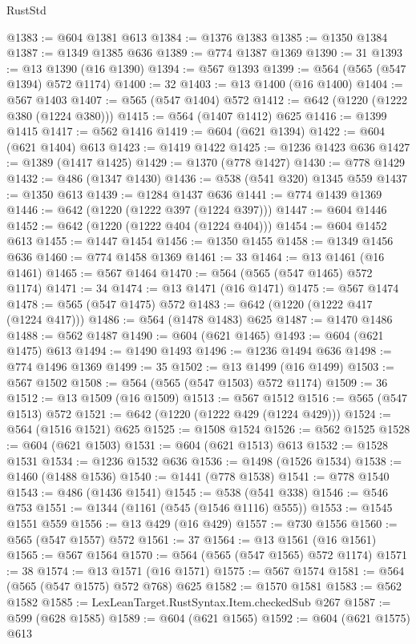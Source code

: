 \begin{lexlean}{RustStd}
\begin{coremodule}
@1383 := @604 @1381 @613
@1384 := @1376 @1383
@1385 := @1350 @1384
@1387 := @1349 @1385 @636
@1389 := @774 @1387 @1369
@1390 := 31
@1393 := @13 @1390 (@16 @1390)
@1394 := @567 @1393
@1399 := @564 (@565 (@547 @1394) @572 @1174)
@1400 := 32
@1403 := @13 @1400 (@16 @1400)
@1404 := @567 @1403
@1407 := @565 (@547 @1404) @572
@1412 := @642 (@1220 (@1222 @380 (@1224 @380)))
@1415 := @564 (@1407 @1412) @625
@1416 := @1399 @1415
@1417 := @562 @1416
@1419 := @604 (@621 @1394)
@1422 := @604 (@621 @1404) @613
@1423 := @1419 @1422
@1425 := @1236 @1423 @636
@1427 := @1389 (@1417 @1425)
@1429 := @1370 (@778 @1427)
@1430 := @778 @1429
@1432 := @486 (@1347 @1430)
@1436 := @538 (@541 @320) @1345 @559
@1437 := @1350 @613
@1439 := @1284 @1437 @636
@1441 := @774 @1439 @1369
@1446 := @642 (@1220 (@1222 @397 (@1224 @397)))
@1447 := @604 @1446
@1452 := @642 (@1220 (@1222 @404 (@1224 @404)))
@1454 := @604 @1452 @613
@1455 := @1447 @1454
@1456 := @1350 @1455
@1458 := @1349 @1456 @636
@1460 := @774 @1458 @1369
@1461 := 33
@1464 := @13 @1461 (@16 @1461)
@1465 := @567 @1464
@1470 := @564 (@565 (@547 @1465) @572 @1174)
@1471 := 34
@1474 := @13 @1471 (@16 @1471)
@1475 := @567 @1474
@1478 := @565 (@547 @1475) @572
@1483 := @642 (@1220 (@1222 @417 (@1224 @417)))
@1486 := @564 (@1478 @1483) @625
@1487 := @1470 @1486
@1488 := @562 @1487
@1490 := @604 (@621 @1465)
@1493 := @604 (@621 @1475) @613
@1494 := @1490 @1493
@1496 := @1236 @1494 @636
@1498 := @774 @1496 @1369
@1499 := 35
@1502 := @13 @1499 (@16 @1499)
@1503 := @567 @1502
@1508 := @564 (@565 (@547 @1503) @572 @1174)
@1509 := 36
@1512 := @13 @1509 (@16 @1509)
@1513 := @567 @1512
@1516 := @565 (@547 @1513) @572
@1521 := @642 (@1220 (@1222 @429 (@1224 @429)))
@1524 := @564 (@1516 @1521) @625
@1525 := @1508 @1524
@1526 := @562 @1525
@1528 := @604 (@621 @1503)
@1531 := @604 (@621 @1513) @613
@1532 := @1528 @1531
@1534 := @1236 @1532 @636
@1536 := @1498 (@1526 @1534)
@1538 := @1460 (@1488 @1536)
@1540 := @1441 (@778 @1538)
@1541 := @778 @1540
@1543 := @486 (@1436 @1541)
@1545 := @538 (@541 @338)
@1546 := @546 @753
@1551 := @1344 (@1161 (@545 (@1546 @1116) @555))
@1553 := @1545 @1551 @559
@1556 := @13 @429 (@16 @429)
@1557 := @730 @1556
@1560 := @565 (@547 @1557) @572
@1561 := 37
@1564 := @13 @1561 (@16 @1561)
@1565 := @567 @1564
@1570 := @564 (@565 (@547 @1565) @572 @1174)
@1571 := 38
@1574 := @13 @1571 (@16 @1571)
@1575 := @567 @1574
@1581 := @564 (@565 (@547 @1575) @572 @768) @625
@1582 := @1570 @1581
@1583 := @562 @1582
@1585 := LexLeanTarget.RustSyntax.Item.checkedSub @267
@1587 := @599 (@628 @1585)
@1589 := @604 (@621 @1565)
@1592 := @604 (@621 @1575) @613

\end{coremodule}
\end{lexlean}
